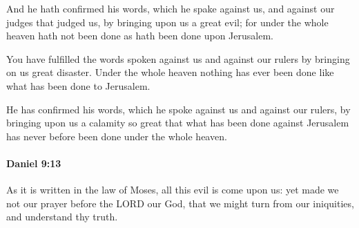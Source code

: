 			\begin{versebox}
					\item[BHS] 
					\item[LXX] 
					\item[ASV] And he hath confirmed his words, which he spake against us, and against our judges that judged us, by bringing upon us a great evil; for under the whole heaven hath not been done as hath been done upon Jerusalem.
					\item[NIV] You have fulfilled the words spoken against us and against our rulers by bringing on us great disaster. Under the whole heaven nothing has ever been done like what has been done to Jerusalem.
					\item[NRSV] He has confirmed his words, which he spoke against us and against our rulers, by bringing upon us a calamity so great that what has been done against Jerusalem has never before been done under the whole heaven.
			\end{versebox}

		\paragraph{Daniel 9:13} %
			\label{DANIEL-9-13}

			As it is written in the law of Moses, all this evil is come upon us: yet made we not our prayer before the LORD our God, that we might turn from our iniquities, and understand thy truth.

